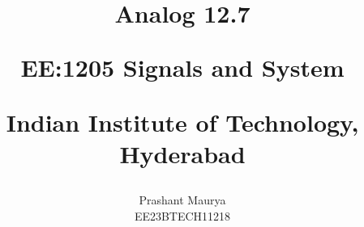 \documentclass[journal,12pt,twocolumn]{IEEEtran}
\theoremstyle{remark}
\begin{document}
%




\vspace{3cm}

\title{
Analog 12.7 

\large{EE:1205 Signals and System}

Indian Institute of Technology, Hyderabad
}
\author{Prashant Maurya

EE23BTECH11218
}	


%
%
%

% 
%



% 
\end{document}
